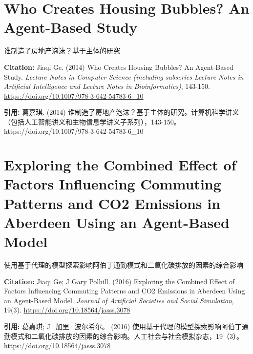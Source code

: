 \chapter{Who Creates Housing Bubbles? An Agent-Based Study}
\begin{center}\small 谁制造了房地产泡沫？基于主体的研究\end{center}

\noindent\textbf{Citation:} Jiaqi Ge. (2014) Who Creates Housing Bubbles? An Agent-Based Study. \textit{Lecture Notes in Computer Science (including subseries Lecture Notes in Artificial Intelligence and Lecture Notes in Bioinformatics)}, 143-150. \url{https://doi.org/10.1007/978-3-642-54783-6_10}

\vspace{0.5em}
\noindent\textbf{引用:} 葛嘉琪. (2014) 谁制造了房地产泡沫？基于主体的研究。计算机科学讲义（包括人工智能讲义和生物信息学讲义子系列），143-150。 https://doi.org/10.1007/978-3-642-54783-6\_10

\vspace{0.5em}
\chapter{Exploring the Combined Effect of Factors Influencing Commuting Patterns and CO2 Emissions in Aberdeen Using an Agent-Based Model}
\begin{center}\small 使用基于代理的模型探索影响阿伯丁通勤模式和二氧化碳排放的因素的综合影响\end{center}

\noindent\textbf{Citation:} Jiaqi Ge; J Gary Polhill. (2016) Exploring the Combined Effect of Factors Influencing Commuting Patterns and CO2 Emissions in Aberdeen Using an Agent-Based Model. \textit{Journal of Artificial Societies and Social Simulation}, 19(3). \url{https://doi.org/10.18564/jasss.3078}

\vspace{0.5em}
\noindent\textbf{引用:} 葛嘉琪; J·加里·波尔希尔。 (2016) 使用基于代理的模型探索影响阿伯丁通勤模式和二氧化碳排放的因素的综合影响。人工社会与社会模拟杂志，19（3）。 https://doi.org/10.18564/jasss.3078

